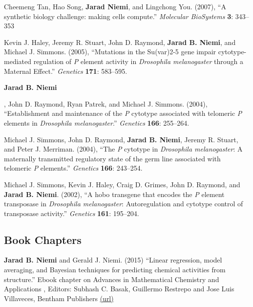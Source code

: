 \documentclass[overlapped,line]{res}
\begin{document}
\begin{resume}
Cheemeng Tan, Hao Song, {\bf Jarad Niemi}, and Lingchong You. (2007), ``A synthetic biology challenge: making cells compute.'' \emph{Molecular BioSystems}  {\bf 3}: 343--353

Kevin J. Haley, Jeremy R. Stuart, John D. Raymond, {\bf Jarad B. Niemi}, and Michael J. Simmons. (2005), ``Mutations in the Su(var)2-5 gene impair cytotype-mediated regulation of \emph{P} element activity in \emph{Drosophila melanogaster} through a Maternal Effect.'' \emph{Genetics} {\bf 171}: 583--595.



\newpage \opening

{\bf Jarad B. Niemi}, John D. Raymond, Ryan Patrek, and Michael J. Simmons. (2004), ``Establishment and maintenance of the \emph{P} cytotype associated with telomeric \emph{P} elements in \emph{Drosophila melanogaster}.'' \emph{Genetics} {\bf 166}: 255--264.

Michael J. Simmons, John D. Raymond, {\bf Jarad B. Niemi}, Jeremy R. Stuart, and Peter J. Merriman. (2004), ``The \emph{P} cytotype in \emph{Drosophila melanogaster}: A maternally transmitted regulatory state of the germ line associated with telomeric \emph{P} elements.'' \emph{Genetics} {\bf 166}: 243--254.


Michael J. Simmons, Kevin J. Haley, Craig D. Grimes, John D. Raymond, and {\bf Jarad B. Niemi}. (2002), ``A hobo transgene that encodes the \emph{P} element transposase in \emph{Drosophila melanogaster}: Autoregulation and cytotype control of transposase activity.'' \emph{Genetics} {\bf 161}: 195--204.




\subsection{\bf Book Chapters}

{\bf Jarad B. Niemi} and Gerald J. Niemi. (2015) ``Linear regression, model averaging, and Bayesian techniques for predicting chemical activities from structure.'' Ebook chapter on Advances in Mathematical Chemistry and Applications
, Editors: Subhash C. Basak, Guillermo Restrepo and Jose Luis Villaveces, Bentham Publishers \href{http://www.eurekaselect.com/132675/chapter/linear-regression%2C-model-averaging%2C-and-bayesian-techniques-for-predicting-chemical-activities-from-structur}{(url)}



\end{resume}
\end{document}
